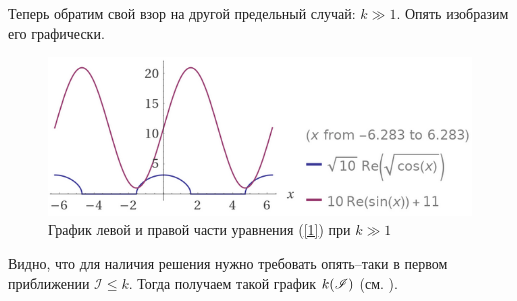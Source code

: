 \documentclass[a4paper,9pt,russian]{article}
\newcommand{\I}{\mathscr{I}}
\renewcommand{\-}{\bar}
\begin{document}
\par
Теперь обратим свой взор на другой предельный случай: $k \gg 1$. Опять изобразим его графически.
\begin{figure}[h]
 \centering
 \includegraphics[width = 100 mm]{graf2.png}
 \caption{График левой и правой части уравнения (\ref{1}) при $k \gg 1$}
 \label{graf}
\end{figure}
\par
Видно, что для наличия решения нужно требовать опять--таки в первом приближении $\I \le k$. Тогда получаем такой график $k \qty(\I)$ (см. ).
\end{document}
